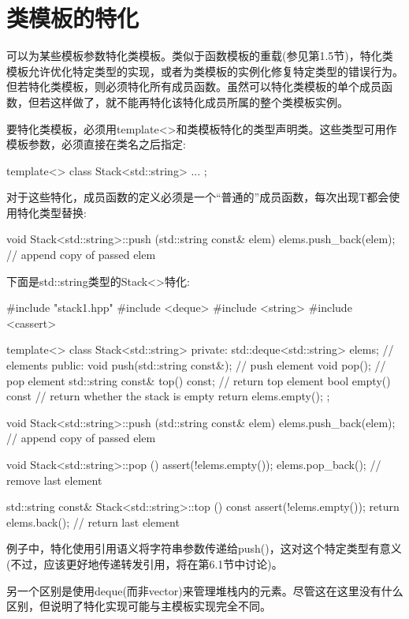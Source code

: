 \section{类模板的特化}

可以为某些模板参数特化类模板。类似于函数模板的重载(参见第1.5节)，特化类模板允许优化特定类型的实现，或者为类模板的实例化修复特定类型的错误行为。但若特化类模板，则必须特化所有成员函数。虽然可以特化类模板的单个成员函数，但若这样做了，就不能再特化该特化成员所属的整个类模板实例。

要特化类模板，必须用template<>和类模板特化的类型声明类。这些类型可用作模板参数，必须直接在类名之后指定:

\begin{cpp}
template<>
class Stack<std::string> {
	...
};
\end{cpp}

对于这些特化，成员函数的定义必须是一个“普通的”成员函数，每次出现T都会使用特化类型替换:

\begin{cpp}
void Stack<std::string>::push (std::string const& elem)
{
	elems.push_back(elem); // append copy of passed elem
}
\end{cpp}

下面是std::string类型的Stack<>特化:

\begin{cpp}
#include "stack1.hpp"
#include <deque>
#include <string>
#include <cassert>

template<>
class Stack<std::string> {
	private:
	std::deque<std::string> elems; // elements
	public:
	void push(std::string const&); // push element
	void pop(); // pop element
	std::string const& top() const; // return top element
	bool empty() const { // return whether the stack is empty
		return elems.empty();
	}
};

void Stack<std::string>::push (std::string const& elem)
{
	elems.push_back(elem); // append copy of passed elem
}

void Stack<std::string>::pop ()
{
	assert(!elems.empty());
	elems.pop_back(); // remove last element
}

std::string const& Stack<std::string>::top () const
{
	assert(!elems.empty());
	return elems.back(); // return last element
}
\end{cpp}

例子中，特化使用引用语义将字符串参数传递给push()，这对这个特定类型有意义(不过，应该更好地传递转发引用，将在第6.1节中讨论)。

另一个区别是使用deque(而非vector)来管理堆栈内的元素。尽管这在这里没有什么区别，但说明了特化实现可能与主模板实现完全不同。





















